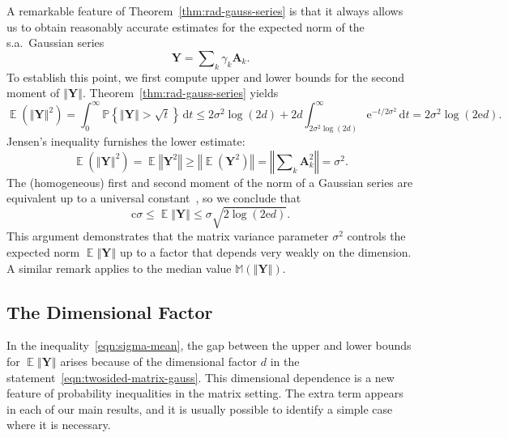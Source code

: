 \documentclass[11pt,letterpaper,twoside,reqno,draft]{amsart}
\theoremstyle{remark}
\numberwithin{equation}{section}
\numberwithin{thm}{section}
\begin{document}
A remarkable feature of Theorem~\ref{thm:rad-gauss-series} is that it always allows us to obtain reasonably accurate estimates for the expected norm of the s.a.~Gaussian series
\begin{equation} \label{eqn:gauss-series}
{\bm{{Y}}} = \sum\nolimits_{k} \gamma_k {\bm{{A}}}_k.
\end{equation}
To establish this point, we first compute upper and lower bounds for the second moment of ${\left\Vert {{{\bm{{Y}}}}} \right\Vert}$.  Theorem~\ref{thm:rad-gauss-series} yields
\begin{equation*}
	{\operatorname{\mathbb{E}}}( {{\left\Vert {{{ {\bm{{Y}}} }}} \right\Vert}^2} )
	= \int_0^\infty {\mathbb{P}\left\{ {{ {\left\Vert {{ {\bm{{Y}}} }} \right\Vert} > \sqrt{t} }} \right\}} {\, {\mathrm{d}{{{t}}}}}
	\leq 2 \sigma^2 \log(2d) + 2d \int_{2 \sigma^2 \log(2d)}^\infty
	{\mathrm{e}}^{-t/2\sigma^2} {\, {\mathrm{d}{{{t}}}}}
	= 2\sigma^2 \log(2 {\mathrm{e}} d).
\end{equation*}
Jensen's inequality furnishes the lower estimate:
$$
{\operatorname{\mathbb{E}}}( {{\left\Vert {{{{\bm{{Y}}}}}} \right\Vert}^2} )
	= {\operatorname{\mathbb{E}}} {\left\Vert {{ {\bm{{Y}}}^2 }} \right\Vert}
	\geq {\left\Vert {{ {\operatorname{\mathbb{E}}} ({\bm{{Y}}}^2) }} \right\Vert}
	= {\left\Vert {{ \sum\nolimits_k {\bm{{A}}}_k^2 }} \right\Vert}
	= \sigma^2.
$$
The (homogeneous) first and second moment of the norm of a Gaussian series 
are equivalent up to a universal constant~\cite[Cor.~3.2]{LT91:Probability-Banach},
so we conclude that
\begin{equation} \label{eqn:sigma-mean}
{\mathrm{{c}}} \sigma \leq {\operatorname{\mathbb{E}}} {\left\Vert {{ {\bm{{Y}}} }} \right\Vert} \leq \sigma \sqrt{2 \log(2{\mathrm{e}} d)}.
\end{equation}
This argument demonstrates that the matrix variance parameter $\sigma^2$ controls the expected norm ${\operatorname{\mathbb{E}}} {\left\Vert {{ {\bm{{Y}}} }} \right\Vert}$ up to a factor that depends very weakly on the dimension.  A similar remark applies to the median value $\mathbb{M}( {\left\Vert {{{\bm{{Y}}}}} \right\Vert} )$.

\subsection{The Dimensional Factor} \label{sec:dim-factor}

In the inequality~\eqref{eqn:sigma-mean}, the gap between the upper and lower bounds for ${\operatorname{\mathbb{E}}} {\left\Vert {{{\bm{{Y}}}}} \right\Vert}$ arises because of the dimensional factor $d$ in the statement~\eqref{eqn:twosided-matrix-gauss}.  This dimensional dependence is a new feature of probability inequalities in the matrix setting.  The extra term appears in each of our main results, and it is usually possible to identify a simple case where it is necessary.
\end{document}
